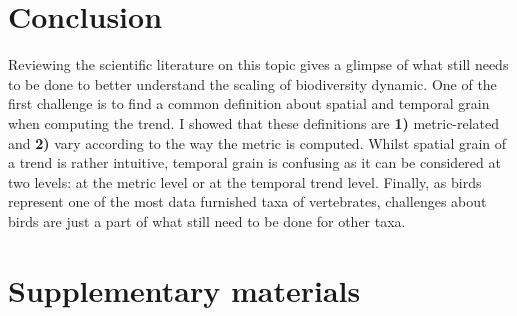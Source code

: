 \documentclass[
  12pt,
  oneside]{report}
\begin{document}
\hypertarget{conclusion}{%
\chapter{Conclusion}\label{conclusion}}

Reviewing the scientific literature on this topic gives a glimpse of what still needs to be done to better understand the scaling of biodiversity dynamic. One of the first challenge is to find a common definition about spatial and temporal grain when computing the trend. I showed that these definitions are \textbf{1)} metric-related and \textbf{2)} vary according to the way the metric is computed. Whilst spatial grain of a trend is rather intuitive, temporal grain is confusing as it can be considered at two levels: at the metric level or at the temporal trend level. Finally, as birds represent one of the most data furnished taxa of vertebrates, challenges about birds are just a part of what still need to be done for other taxa.

\newpage
\begin{singlespacing}
\printbibliography[heading=bibintoc, title={References}]
\end{singlespacing}

\newpage

\hypertarget{supplementary-materials}{%
\chapter*{Supplementary materials}\label{supplementary-materials}}
\end{document}
